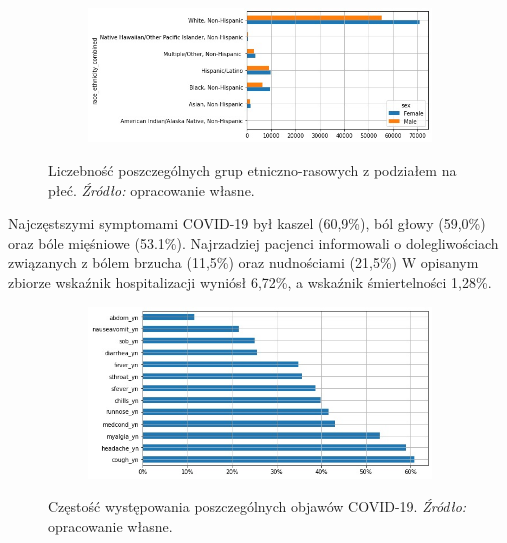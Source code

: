 \documentclass[polish, twoside, 12pt, a4paper]{article}
\theoremstyle{definition}
\theoremstyle{plain}
\theoremstyle{remark}
\begin{document}
\begin{figure}[H]
  \centering
  \begin{subfigure}[t]{\textwidth}
    \includegraphics[width=15cm]{race_sex_count_plot.jpg}
  \end{subfigure}
  \captionsetup{margin=10pt,font=small,labelfont=bf,width=.8\textwidth}
  \caption{Liczebność poszczególnych grup etniczno-rasowych z podziałem na płeć. \textit{Źródło:} opracowanie własne.}\label{figure:sex-race-count}
\end{figure}

Najczęstszymi symptomami COVID-19 był kaszel (60,9\%), ból głowy (59,0\%) oraz bóle mięśniowe (53.1\%). Najrzadziej pacjenci informowali o dolegliwościach związanych z bólem brzucha (11,5\%) oraz nudnościami (21,5\%) W opisanym zbiorze wskaźnik hospitalizacji wyniósł 6,72\%, a wskaźnik śmiertelności 1,28\%.

\begin{figure}[H]
  \centering
  \begin{subfigure}[t]{\textwidth}
    \includegraphics[width=15cm]{symptoms-freq.jpg}
  \end{subfigure}
  \captionsetup{margin=10pt,font=small,labelfont=bf,width=.8\textwidth}
  \caption{Częstość występowania poszczególnych objawów COVID-19. \textit{Źródło:} opracowanie własne.}\label{fig:figure:xx4}
\end{figure}
\end{document}
